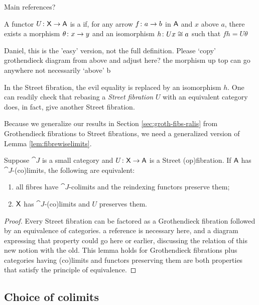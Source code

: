 \documentclass{amsart}
\begin{document}
{\chris Main references?}


\begin{defn}
  A functor $ U \colon \mathsf{X} \to \mathsf{A} $ is a  if, for any arrow $ f \colon a \to b $ in $ \mathsf{A}
  $ and $ x $ above $ a $, there exists a
  morphism  $ \theta \colon x \to y $ and an
  isomorphism $ h \colon Ux \cong a $ such that $ fh = U\theta $
  
\end{defn}{\chris Daniel, this is the 'easy' version, not the full definition. Please `copy' grothendieck diagram from above and adjust here? the morphism up top can go anywhere not necessarily `above' b}

In the Street fibration, the evil equality is replaced by an
isomorphism $ h $.  One can readily check that rebasing a
\emph{Street fibration} $ U $ with an equivalent category
does, in fact, give another Street fibration.

Because we generalize our results in Section
\ref{sec:groth-fibs-ralis} from Grothendieck fibrations to
Street fibrations, we need a generalized version of Lemma
\ref{lem:fibrewiselimits}.

\begin{lem} \label{lem:street-fibrewise-limits}
  Suppose $ \cat{J} $ is a small category and $ U \colon \mathsf{X}
  \to \mathsf{A} $ is a Street (op)fibration. If $ \mathsf{A} $ has $ \cat{J}
  $-(co)limits, the following are equivalent:
  \begin{enumerate}
  \item
    all fibres have $ \cat{J} $-colimits and the
    reindexing functors preserve them;
  \item
    $ \mathsf{X} $ has $ \cat{J} $-(co)limits and $ U $ preserves
    them.
  \end{enumerate}
\end{lem}

\begin{proof}
  Every Street fibration can be factored as a Grothendieck
  fibration followed by an equivalence of categories. {\chris a reference is necessary here, and a diagram expressing that property could go here or earlier, discussing the relation of this new notion with the old.} This
  lemma holds for Grothendieck fibrations plus categories having
  (co)limits and functors preserving them are both properties
  that satisfy the principle of equivalence.   
\end{proof}

\subsection*{Choice of colimits}
\end{document}
